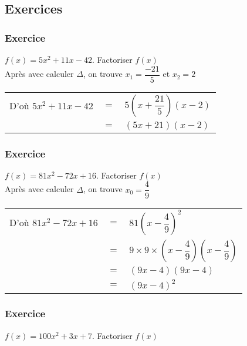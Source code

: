 \subsection{Exercices}

\subsubsection{Exercice }

$f\left(x\right) = 5x^2 + 11x - 42$. Factoriser $f\left(x\right)$ \\

Après avec calculer $\Delta$, on trouve $ x_1 = \dfrac{-21}{5} $ et $x_2 = 2$ \\

\begin{tabular}{lll}
D'où $5x^2 + 11x - 42$ & $=$ & $5\left(x+\dfrac{21}{5}\right)\left(x-2\right)$ \\
& $=$ & $\left(5x+21\right)\left(x-2\right)$ \\
\end{tabular}

\subsubsection{Exercice }

$f\left(x\right) = 81x^2 - 72x + 16$. Factoriser $f\left(x\right)$ \\

Après avec calculer $\Delta$, on trouve $ x_0 = \dfrac{4}{9} $ \\

\begin{tabular}{lll}
D'où $81x^2 - 72x + 16$ & $=$ & $81\left(x-\dfrac{4}{9}\right)^2$ \\
& $=$ &  $9 \times 9 \times \left(x-\dfrac{4}{9}\right)
\left(x-\dfrac{4}{9}\right)$\\
& $=$ & $\left(9x - 4\right)\left(9x - 4\right)$ \\
& $=$ & $\left(9x - 4\right)^2$ \\
\end{tabular}

\subsubsection{Exercice }

$f\left(x\right) = 100x^2 + 3x + 7$. Factoriser $f\left(x\right)$ \\

